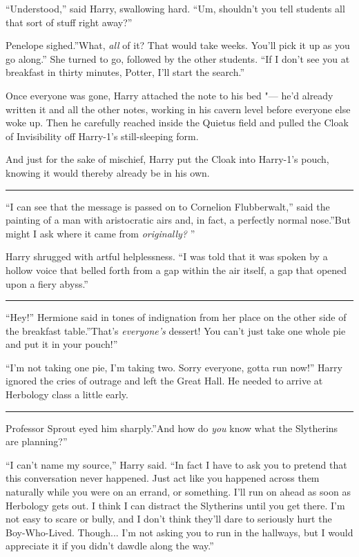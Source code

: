 ``Understood,'' said Harry, swallowing hard. ``Um, shouldn't you tell
students all that sort of stuff right away?''

Penelope sighed.''What, \emph{all} of it? That would take weeks. You'll
pick it up as you go along.'' She turned to go, followed by the other
students. ``If I don't see you at breakfast in thirty minutes, Potter,
I'll start the search.''

Once everyone was gone, Harry attached the note to his bed "--- he'd
already written it and all the other notes, working in his cavern level
before everyone else woke up. Then he carefully reached inside the
Quietus field and pulled the Cloak of Invisibility off Harry-1's
still-sleeping form.

And just for the sake of mischief, Harry put the Cloak into Harry-1's
pouch, knowing it would thereby already be in his own.

\begin{center}\rule{3in}{0.4pt}\end{center}

``I can see that the message is passed on to Cornelion Flubberwalt,''
said the painting of a man with aristocratic airs and, in fact, a
perfectly normal nose.''But might I ask where it came from
\emph{originally?} ''

Harry shrugged with artful helplessness. ``I was told that it was spoken
by a hollow voice that belled forth from a gap within the air itself, a
gap that opened upon a fiery abyss.''

\begin{center}\rule{3in}{0.4pt}\end{center}

``Hey!'' Hermione said in tones of indignation from her place on the
other side of the breakfast table.''That's \emph{everyone's} dessert!
You can't just take one whole pie and put it in your pouch!''

``I'm not taking one pie, I'm taking two. Sorry everyone, gotta run
now!'' Harry ignored the cries of outrage and left the Great Hall. He
needed to arrive at Herbology class a little early.

\begin{center}\rule{3in}{0.4pt}\end{center}

Professor Sprout eyed him sharply.''And how do \emph{you} know what the
Slytherins are planning?''

``I can't name my source,'' Harry said. ``In fact I have to ask you to
pretend that this conversation never happened. Just act like you
happened across them naturally while you were on an errand, or
something. I'll run on ahead as soon as Herbology gets out. I think I
can distract the Slytherins until you get there. I'm not easy to scare
or bully, and I don't think they'll dare to seriously hurt the
Boy-Who-Lived. Though... I'm not asking you to run in the hallways,
but I would appreciate it if you didn't dawdle along the way.''

